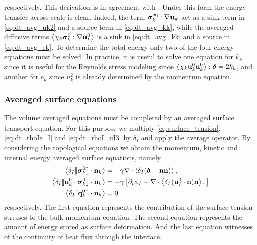 respectively. 
This derivation is in agreement with \citet{morel2015mathematical}. 
Under this form the energy transfer across scale is clear. 
Indeed, the term $\bm{\sigma}_k^\text{eq} : \mathbf{\nabla} \textbf{u}_k$ act as a sink term in \ref{eq:dt_avg_uk2} and a source term in \ref{eq:dt_avg_kk}, while the averaged diffusive terms $\left<\chi_k\bm{\sigma}_k^0 : \mathbf{\nabla} \textbf{u}_k^0\right>$ is a sink in \ref{eq:dt_avg_kk} and a source in \ref{eq:dt_avg_ek}. 
To determine the total energy only two of the four energy equations must be solved. 
In practice, it is useful to solve one equation for $k_k$ since it is useful for the Reynolds stress modeling since $\left<\chi_k \textbf{u}_k^0 \textbf{u}_k^0\right>: \bm\delta = 2 k_k$, and another for $e_k$ since $u_k^2$ is already determined by the momentum equation. 

\subsubsection{Averaged surface equations}
The volume averaged equations must be completed by an averaged surface transport equation.  
For this purpose we multiply \ref{eq:surface_tension}, \ref{eq:dt_rhoIe_I} and \ref{eq:dt_rhoI_uI3} by $\delta_I$ and apply the average operator.
By considering the topological equations we obtain the  momentum, kinetic and internal energy averaged surface equations, namely
\begin{align}
    \label{eq:dt_avg_uI}
    \left<\delta_I \llbracket \bm{\sigma}^0_k \rrbracket \cdot \textbf{n}_k\right>
    &= -\gamma \mathbf{\nabla}\cdot \left<\delta_I (\bm\delta - \textbf{nn})\right>,\\
    \label{eq:dt_avg_gamma}
    \left<\delta_I \llbracket \textbf{u}_k^0 \cdot \bm{\sigma}^0_k \rrbracket \cdot \textbf{n}_k\right>
    &= - \gamma \left[
        \partial_t \phi_I
        +  \mathbf{\nabla}\cdot \left<\delta_I (\textbf{u}_{I}^0 \cdot \textbf{n})\textbf{n} \right>,
    \right]\\
    \left<\delta_I \llbracket \textbf{q}^0_k \rrbracket \cdot \textbf{n}_k\right>
    &= 0
\end{align}
respectively. 
The first equation represents the contribution of the surface tension stresses to the bulk momentum equation.
The second equation represents the amount of energy stored as surface deformation.
And the last equation witnesses of the continuity of heat flux through the interface. 

